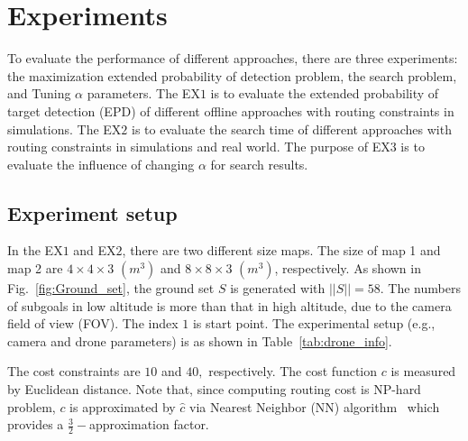 \chapter{Experiments}
To evaluate the performance of different approaches, there are three experiments:
the maximization extended probability of detection problem, the search problem, and Tuning $\alpha$ parameters.
The EX$1$ is to evaluate the extended probability of target detection (EPD) of different offline approaches with routing constraints in simulations.
The EX$2$ is to evaluate the search time of different approaches with routing constraints in simulations and real world.
The purpose of EX3 is to evaluate the influence of changing $\alpha$ for search results.

\section{Experiment setup}
In the EX$1$ and EX$2$, there are two different size maps.
The size of  map 1 and map 2 are  $4 \times 4 \times 3$ $(m^3)$ and $8 \times 8 \times 3$ $(m^3)$, respectively.
As shown in Fig.~\ref{fig:Ground_set}, the ground set $S$ is generated with $||S|| = 58.$
The numbers of subgoals in low altitude is more than that in high altitude, due to the camera field of view (FOV).
The index $1$ is start point.
The experimental setup (e.g., camera and drone parameters) is as shown in Table~\ref{tab:drone_info}.

The cost constraints are $10$ and $40,$ respectively.
The cost function $c$ is measured by Euclidean distance.
Note that, since computing routing cost is NP-hard problem, $c$ is approximated by $\hat{c}$ via Nearest Neighbor (NN) algorithm~\cite{rosenkrantz1977analysis} which provides a $\frac{3}{2}-$approximation factor.



